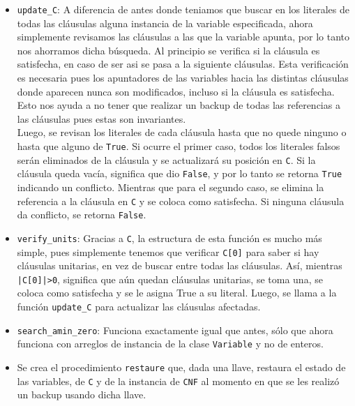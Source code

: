 \documentclass[letterpaper,12pt]{article}
\begin{document}
\begin{itemize}
	\item \texttt{update\_C}: A diferencia de antes donde teniamos que buscar en los literales de todas las cl\'ausulas alguna instancia de la variable especificada, ahora simplemente revisamos las cl\'ausulas a las que la variable apunta, por lo tanto nos ahorramos dicha b\'usqueda. Al principio se verifica si la cl\'ausula es satisfecha, en caso de ser asi se pasa a la siguiente cl\'ausulas. Esta verificaci\'on es necesaria pues los apuntadores de las variables hacia las distintas cl\'ausulas donde aparecen nunca son modificados, incluso si la cl\'ausula es satisfecha. Esto nos ayuda a no tener que realizar un backup de todas las referencias a las cl\'ausulas pues estas son invariantes.\\
	
	Luego, se revisan los literales de cada cl\'ausula hasta que no quede ninguno o hasta que alguno de \texttt{True}. Si ocurre el primer caso, todos los literales falsos ser\'an eliminados de la cl\'ausula y se actualizar\'a su posici\'on en \texttt{C}. Si la cl\'ausula queda vac\'ia, significa que dio \texttt{False}, y por lo tanto se retorna \texttt{True} indicando un conflicto. Mientras que para el segundo caso, se elimina la referencia a la cl\'ausula en \texttt{C} y se coloca como satisfecha. Si ninguna cl\'ausula da conflicto, se retorna \texttt{False}.
	
	\item \texttt{verify\_units}: Gracias a \texttt{C}, la estructura de esta funci\'on es mucho m\'as simple, pues simplemente tenemos que verificar \texttt{C[0]} para saber si hay cl\'ausulas unitarias, en vez de buscar entre todas las cl\'ausulas. As\'i, mientras \texttt{|C[0]|>0}, significa que a\'un quedan cl\'ausulas unitarias, se toma una, se coloca como satisfecha y se le asigna True a su literal. Luego, se llama a la funci\'on \texttt{update\_C} para actualizar las cl\'ausulas afectadas.
	
	\item \texttt{search\_amin\_zero}: Funciona exactamente igual que antes, s\'olo que ahora funciona con arreglos de instancia de la clase \texttt{Variable} y no de enteros.
	
	\item Se crea el procedimiento \texttt{restaure} que, dada una llave, restaura el estado de las variables, de \texttt{C} y de la instancia de \texttt{CNF} al momento en que se les realiz\'o un backup usando dicha llave.
	

\end{itemize}
\end{document}
